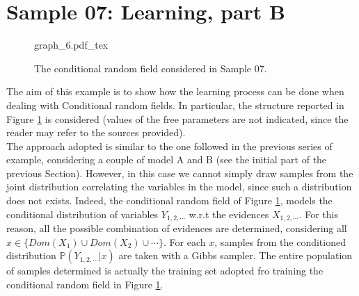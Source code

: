 \section{Sample 07: Learning, part B}

\begin{figure}
	\centering
\def\svgwidth{0.6 \textwidth}
{graph_6.pdf_tex} 
\caption{The conditional random field considered in Sample 07.}
\label{fig:sample_07:0}
\end{figure}

The aim of this example is to show how the learning process can be done when dealing with Conditional random fields. In particular, the structure  reported in Figure \ref{fig:sample_07:0} is considered (values of the free parameters are not indicated, since the reader may refer to the sources provided).
\\
The approach adopted is similar to the one followed in the previous series of example, considering a couple of model A and B (see the initial part of the previous Section). However, in this case we cannot simply draw samples from the joint distribution correlating the variables in the model, since such a distribution does not exists. Indeed, the conditional random field of Figure \ref{fig:sample_07:0}, models the conditional distribution of variables $Y_{1,2,\cdots}$ w.r.t the evidences $X_{1,2,\cdots}$. For this reason, all the possible combination of evidences are determined, considering all $x \in \lbrace Dom(X_1) \cup Dom(X_2) \cup \cdots \rbrace$. For each $x$, samples from the conditioned distribution $\mathbb{P}(Y_{1,2,\cdots} | x)$ are taken with a Gibbs sampler. The entire population of samples determined is actually the training set adopted fro training the conditional random field in Figure \ref{fig:sample_07:0}.
 
